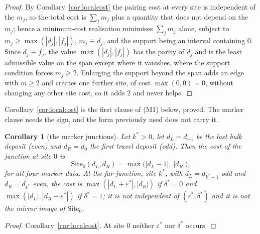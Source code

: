 \documentclass[11pt]{article}
\theoremstyle{plain}
\newtheorem{corollary}[theorem]{Corollary}
\theoremstyle{definition}
\theoremstyle{remark}
\begin{document}
\begin{proof}
By Corollary~\ref{cor:localcost} the pairing cost at every site is independent of the $m_j$, so the
total cost is $\sum_jm_j$ plus a quantity that does not depend on the $m_j$; hence a minimum-cost
realisation minimises $\sum_jm_j$ alone, subject to $m_j\ge\max(|d_j|,|f_j|)$, $m_j\equiv d_j$, and
the support being an interval containing $0$. Since $d_j\equiv f_j$, the value
$\max(|d_j|,|f_j|)$ has the parity of $d_j$ and is the least admissible value on the span except
where it vanishes, where the support condition forces $m_j\ge2$. Enlarging the support beyond the
span adds an edge with $m\ge2$ and creates one further site, of cost $\max(0,0)=0$, without
changing any other site cost, so it adds $2$ and never helps.
\end{proof}

\noindent Corollary~\ref{cor:localcost} is the first clause of \textup{(M1)} below, proved. The
marker clause needs the sign, and the form previously used does not carry it.

\begin{corollary}[the marker junctions]\label{cor:marker}
Let $k^\ast>0$, let $d_L=d_{-1}$ be the last bulk deposit \textup{(}even\textup{)} and $d_R=d_0$ the
first travel deposit \textup{(}odd\textup{)}. Then the cost of the junction at site $0$ is
\[
   \mathrm{Site}_0(d_L,d_R)=\max\bigl(|d_L-1|,\ |d_R|\bigr),
\]
for all four marker data. At the far junction, site $k^\ast$, with $d_L=d_{k^\ast-1}$ odd and
$d_R=d_{k^\ast}$ even, the cost is $\max(|d_L+\varepsilon^\ast|,|d_R|)$ if $\delta^\ast=0$ and
$\max(|d_L|,|d_R-\varepsilon^\ast|)$ if $\delta^\ast=1$; it is not independent of
$(\varepsilon^\ast,\delta^\ast)$ and it is not the mirror image of $\mathrm{Site}_0$.
\end{corollary}

\begin{proof}
Corollary~\ref{cor:localcost}. At site $0$ neither $\varepsilon^\ast$ nor $\delta^\ast$ occurs.
\end{proof}
\end{document}
